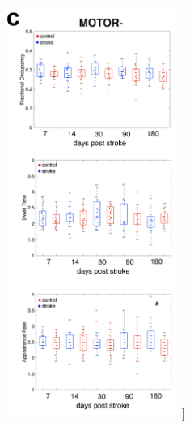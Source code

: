 \documentclass[phd,tocprelim]{cornell}
\renewcommand{\caption}[1]{\singlespacing\hangcaption{#1}\normalspacing}
\begin{document}
\begin{figure}[h!]
		\ContinuedFloat
		\captionsetup{labelformat=adja-page}
    \centering
    \includegraphics[width=0.5\textwidth]{chapter2/SupplementaryFig8c.png}
    \caption[]{}
\end{figure}
\null
\vfill
\clearpage
\null
\vfill
\end{document}
